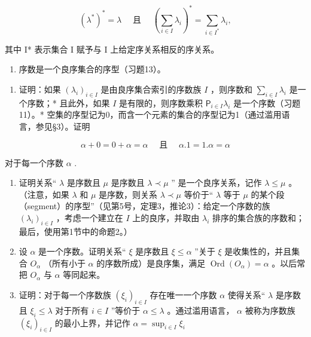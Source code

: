 \[
(\lambda^ {*}) ^ {*} = \lambda \quad \text { 且 } \quad \left(\sum_ {i \in I} \lambda_ {i}\right) ^ {*} = \sum_ {i \in I ^ {*}} \lambda_ {i},
\]

其中 I* 表示集合 I 赋予与 I 上给定序关系相反的序关系。

\begin{enumerate}
\def\labelenumi{\arabic{enumi}.}
\setcounter{enumi}{13}
\tightlist
\item
  序数是一个良序集合的序型（习题13）。
\end{enumerate}

\begin{enumerate}
\def\labelenumi{(\alph{enumi})}
\tightlist
\item
  证明：如果 \((\lambda_{i})_{i\in I}\) 是由良序集合索引的序数族 \(I\) ，则序数和 \(\sum_{i\in I}\lambda_{i}\) 是一个序数；* 且此外，如果 \(I\) 是有限的，则序数乘积 \(\mathsf{P}_{i\in I}\lambda_{i}\) 是一个序数（习题11）。* 空集的序型记为0，而含一个元素的集合的序型记为1（通过滥用语言，参见§3）。证明
\end{enumerate}

\[
\alpha + 0 = 0 + \alpha = \alpha \quad \text { 且 } \quad \alpha . 1 = 1. \alpha = \alpha
\]

对于每一个序数 \(\alpha\) .

\begin{enumerate}
\def\labelenumi{(\alph{enumi})}
\setcounter{enumi}{1}
\item
  证明关系“ \(\lambda\) 是序数且 \(\mu\) 是序数且 \(\lambda \prec \mu\) '' 是一个良序关系，记作 \(\lambda \leqslant \mu\) 。 （注意，如果 \(\lambda\) 和 \(\mu\) 是序数，则关系 \(\lambda \prec \mu\) 等价于“ \(\lambda\) 等于 \(\mu\) 的某个段（segment）的序型”（见第5号，定理3，推论3）：给定一个序数的族 \((\lambda_{i})_{i \in I}\) ，考虑一个建立在 \(I\) 上的良序，并取由 \(\lambda_{i}\) 排序的集合族的序数和；最后，使用第1节中的命题2。）
\item
  设 \(\alpha\) 是一个序数。证明关系“ \(\xi\) 是序数且 \(\xi \leqslant \alpha\) ”关于 \(\xi\) 是收集性的，并且集合 \(O_{\alpha}\) （所有小于 \(\alpha\) 的序数所成）是良序集，满足 \(\operatorname{Ord}(O_{\alpha}) = \alpha\) 。以后常把 \(O_{\alpha}\) 与 \(\alpha\) 等同起来。
\item
  证明：对于每一个序数族 \((\xi_{i})_{i\in I}\) 存在唯一一个序数 \(\alpha\) 使得关系“ \(\lambda\) 是序数且 \(\xi_{i}\leqslant\lambda\) 对于所有 \(i\in I\) ”等价于 \(\alpha\leqslant\lambda\) 。通过滥用语言， \(\alpha\) 被称为序数族 \((\xi_{i})_{i\in I}\) 的最小上界，并记作 \(\alpha=\sup_{i\in I}\xi_{i}\)
\end{enumerate}

